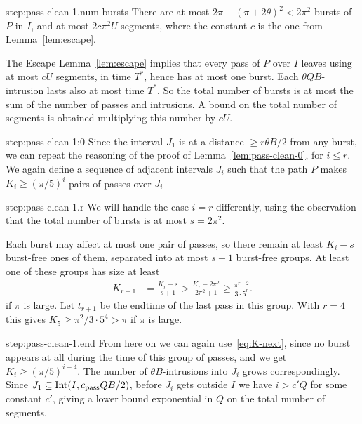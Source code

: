 \documentclass[11pt]{memoir}
\theoremstyle{definition} %
\renewcommand{\le}{\leq}
\renewcommand{\ge}{\geq}
\def\B{B}
\def\U{U}
\newcommand{\Int}{\mathrm{Int}}
\newcommand{\passno}{\pi}
\newcommand{\Q}{Q}
\newcommand{\Tus}{T^{*}}
\newcommand{\cns}[1]{c_{\textrm{\upshape #1}}}
\newcommand{\CPass}{\cns{pass}}
\renewcommand{\r}{r} %
\begin{document}
\begin{Proof}
\begin{step+}{step:pass-clean-1.num-bursts}
  There are at most \( 2\passno+(\passno+2\theta)^{2}<2\passno^{2} \) bursts of \( P \) in \( I \),
  and at most \( 2 c \passno^{2}\U \) segments, where the constant \( c \) is the one from
  Lemma~\ref{lem:escape}.
\end{step+}
\begin{pproof}
  The Escape Lemma~\ref{lem:escape} implies that every pass of \( P \) over \( I \)
  leaves using at most \( c\U \) segments, in time \( \Tus \), hence has at most one burst.
  Each \( \theta\Q\B \)-intrusion lasts also at most time \( \Tus \).
  So the total number of bursts is at most the sum of the number of passes and intrusions.
  A bound on the total number of segments is obtained multiplying this number by \( c\U \).
\end{pproof} %

\begin{step+}{step:pass-clean-1:0}
  Since the interval \( J_{1} \) is at a distance \( \ge\r\theta\B/2 \) from any burst, we can
 repeat the reasoning of the proof of Lemma~\ref{lem:pass-clean-0}, for \( i\le\r \).
  We again define a sequence of adjacent intervals \( J_{i} \) such that the path \( P \) makes
  \( K_{i}\ge(\passno/5)^{i} \) pairs of passes over \( J_{i} \)
\end{step+}
\begin{step+}{step:pass-clean-1.r}
We will handle the case \( i=\r \) differently, using
the observation that the total number of bursts is at most \( s= 2\passno^{2} \).
\end{step+}
\begin{prooof}
Each burst may affect at most one pair of passes, so there remain at least \( K_{i}-s \) burst-free ones of them,
separated into at most \( s+1 \) burst-free groups.
At least one of these groups has size at least
\begin{align*}
  K_{\r+1}&=\frac{K_{\r}-s}{s+1} > \frac{K_{\r}-2\passno^{2}}{2\passno^{2}+1}
            \ge \frac{\passno^{r-2}}{3\cdot 5^{\r}}.
\end{align*}
if \( \passno \) is large.
Let \( t_{r+1} \) be the endtime of the last pass in this group.
With \( \r = 4 \) this gives \( K_{5}\ge \passno^{2}/3\cdot 5^{4} > \passno \) if \( \passno  \) is large.
\end{prooof} %
\begin{step+}{step:pass-clean-1.end}
From here on we can again use~\eqref{eq:K-next}, since no burst appears at all during
the time of this group of passes, and we get \( K_{i}\ge (\passno/5)^{i-4} \).
The number of \( \theta\B \)-intrusions into \( J_{i} \) grows correspondingly.
Since \( J_{1}\subseteq\Int(I,\CPass\Q\B/2) \), before \( J_{i} \) gets outside \( I \)
we have \( i>c'\Q \) for some constant \( c' \), giving a lower bound exponential in \( \Q \)
on the total number of segments.


\end{step+}
\end{Proof}
\end{document}
